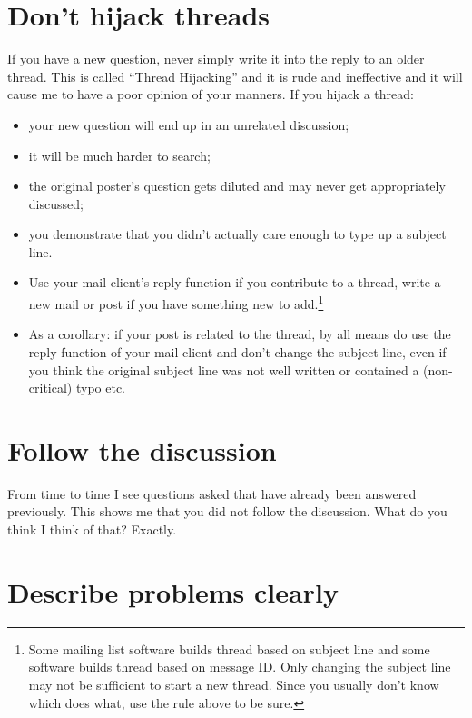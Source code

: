 \documentclass[]{book}
\providecommand{\tightlist}{%
  \setlength{\itemsep}{0pt}\setlength{\parskip}{0pt}}
\let\rmarkdownfootnote\footnote%
\def\footnote{\protect\rmarkdownfootnote}
\begin{document}
\section{Don't hijack threads}\label{dont-hijack-threads}

If you have a new question, never simply write it into the reply to an
older thread. This is called ``Thread Hijacking'' and it is rude and
ineffective and it will cause me to have a poor opinion of your manners.
If you hijack a thread:

\begin{itemize}
\tightlist
\item
  your new question will end up in an unrelated discussion;
\item
  it will be much harder to search;
\item
  the original poster's question gets diluted and may never get
  appropriately discussed;
\item
  you demonstrate that you didn't actually care enough to type up a
  subject line.
\item
  Use your mail-client's reply function if you contribute to a thread,
  write a new mail or post if you have something new to add.\footnote{Some
    mailing list software builds thread based on subject line and some
    software builds thread based on message ID. Only changing the
    subject line may not be sufficient to start a new thread. Since you
    usually don't know which does what, use the rule above to be sure.}
\item
  As a corollary: if your post is related to the thread, by all means do
  use the reply function of your mail client and don't change the
  subject line, even if you think the original subject line was not well
  written or contained a (non-critical) typo etc.
\end{itemize}

\section{Follow the discussion}\label{follow-the-discussion}

From time to time I see questions asked that have already been answered
previously. This shows me that you did not follow the discussion. What
do you think I think of that? Exactly.

\section{Describe problems clearly}\label{describe-problems-clearly}
\end{document}
